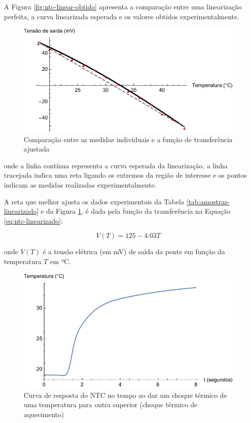 \documentclass[a4paper]{instrumentacao}
\begin{document}
A Figura \ref{fig:ntc-linear-obtido} apresenta a comparação entre uma linearização perfeita, a curva linearizada esperada e os valores obtidos experimentalmente.

\begin{figure}[H]
\center
\includegraphics[width=\textwidth]{NTC-Linear-Obtido.pdf}
\caption{Comparação entre as medidas individuais e a função de transferência ajustada}
\label{ntc-experimental-comparacao}
\end{figure}

\noindent onde a linha contínua representa a curva esperada da linearização, a linha tracejada indica uma reta ligando os extremos da região de interesse e os pontos indicam as medidas realizadas experimentalmente.

A reta que melhor ajusta os dados experimentais da Tabela \ref{tab:amostras-linearizado} e da Figura \ref{ntc-experimental-comparacao}, é dada pela função da transferência na Equação \ref{eq:ntc-linearizado}:


\begin{equation}
	V(T) = 125 - 4.03 T
	\label{eq:ntc-linearizado}
\end{equation}

\noindent onde $V(T)$ é a tensão elétrica (em mV) de saída da ponte em função da temperatura $T$ em ºC.



\begin{figure}[H]
\center
\includegraphics[width=\textwidth]{ThermalShock-Up-Time.pdf}
\caption{Curva de resposta do NTC no tempo ao dar um choque térmico de uma temperatura para outra superior (choque térmico de aquecimento)}
\label{fig:ntc-choque-acima-tempo}
\end{figure}
\end{document}
